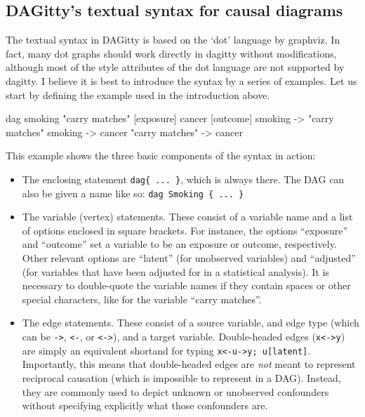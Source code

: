 \documentclass[a4paper]{article} %
\newcommand{\pp}{{\sc DAG}itty\xspace}
\newenvironment{dagcode}{%
\begingroup
\small
\verbatim
}{
\endverbatim
\endgroup
}
\begin{document}
\subsection{\pp's textual syntax for causal diagrams} 

The textual syntax in DAGitty is based on the ‘dot’ language by graphviz. In fact, many dot graphs should work directly in dagitty without modifications, although most of the style attributes of the dot language are not supported by dagitty.
I believe it is best to introduce the syntax by a series of examples. Let us start by defining the example used in the introduction above.

\begin{dagcode}
dag{ 
  smoking
  "carry matches" [exposure]
  cancer [outcome]
  smoking -> "carry matches"
  smoking -> cancer
  "carry matches" -> cancer
}
\end{dagcode}

This example shows the three basic components of the syntax in action:
\begin{itemize}
\item The enclosing statement \verb'dag{ ... }', which is always there. The DAG can also be given a name like so: \verb'dag Smoking { ... }'

\item The variable (vertex) statements. These consist of a variable name and a list of options enclosed in square brackets. For instance, the options ``exposure'' and ``outcome'' set a variable to be an exposure or outcome, respectively. Other relevant options are ``latent'' (for unobserved variables) and ``adjusted'' (for variables that have been adjusted for in a statistical analysis). It is necessary to double-quote the variable names if they contain spaces or other special characters, like for the variable ``carry matches''.

\item The edge statements. These consist of a source variable, and edge type (which can be  \verb|->|, \verb|<-|, or \verb|<->|), and a target variable. Double-headed edges (\verb|x<->y|) are simply an equivalent shortand for typing \verb|x<-u->y; u[latent]|. Importantly, this means that double-headed edges are \emph{not} meant to represent reciprocal causation (which is impossible to represent in a DAG). Instead, they are commonly used to depict unknown or unobserved confounders without specifying explicitly what those confounders are. 
\end{itemize}
\end{document}
